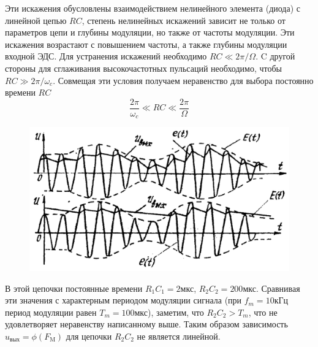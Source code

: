 Эти искажения обусловлены взаимодействием нелинейного элемента (диода) с линейной цепью $RC$, степень нелинейных искажений зависит не только от параметров цепи и глубины модуляции, но также от частоты модуляции. Эти искажения возрастают с повышением частоты, а также глубины модуляции входной ЭДС. Для устранения искажений необходимо $RC\ll2\pi/\Omega$. C другой стороны для сглаживания высокочастотных пульсаций необходимо, чтобы $RC\gg2\pi/\omega_c$. Совмещая эти условия получаем неравенство для выбора постоянно времени $RC$
$$\frac{2\pi}{\omega_c}\ll RC\ll\frac{2\pi}{\Omega}$$
\begin{figure}
	\includegraphics[width=\linewidth]{picture/pic11.jpg}
	\caption{}
	\vspace{-50pt}
	\label{pic:11}
\end{figure}
В этой цепочки постоянные времени $R_1C_1=2\text{мкс}$, $R_2C_2=200\text{мкс}$. Сравнивая эти значения с характерным периодом модуляции сигнала (при $f_m=10\text{кГц}$ период модуляции равен $T_m=100\text{мкс}$), заметим, что $R_2C_2>T_m$, что не удовлетворяет неравенству написанному выше. Таким образом зависимость $u_{\text{вых}} = \phi(F_\text{M})$ для цепочки $R_2C_2$ не является линейной.
